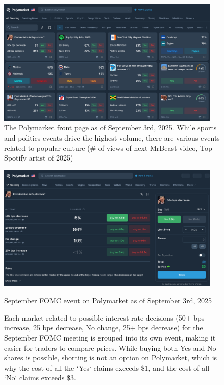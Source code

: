 \begin{figure}[H]
  \begin{center}
    \includegraphics[width=0.95\textwidth]{figures/Polymarket_front_page.png}
  \end{center}
  \caption{The Polymarket front page as of September 3rd, 2025. While sports and politics events drive the highest volume, there are various events related to popular culture (\# of views of next MrBeast video, Top Spotify artist of 2025)}
  \label{fig:front_page}
\end{figure}


\begin{figure}[H]
  \begin{center}
    \includegraphics[width=0.95\textwidth]{figures/FOMC_event_September.png}
  \end{center}
  \caption{September FOMC event on Polymarket as of September 3rd, 2025}
  \caption*{Each market related to possible interest rate decisions (50+ bps increase, 25 bps decrease, No change, 25+ bps decrease) for the September FOMC meeting is grouped into its own event, making it easier for traders to compare prices. While buying both Yes and No shares is possible, shorting is not an option on Polymarket, which is why the cost of all the `Yes` claims exceeds \$1, and the cost of all `No` claims exceeds \$3.}
  \label{fig:FOMC_event_september}
\end{figure}


